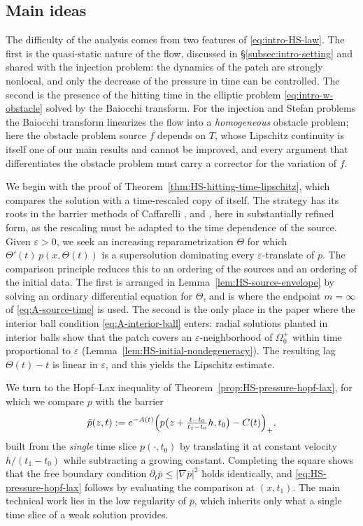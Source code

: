\documentclass[11pt]{amsart}
\numberwithin{equation}{section}
\numberwithin{figure}{section}
\theoremstyle{plain}
\theoremstyle{definition}
\theoremstyle{remark}
\theoremstyle{plain}
\newcommand{\abs}[1]{\lvert #1 \rvert}
\newcommand{\vep}{\varepsilon}
\begin{document}
\subsection{Main ideas}\label{subsec:intro-ideas}

The difficulty of the analysis comes from two features of \eqref{eq:intro-HS-law}.
The first is the quasi-static nature of the
flow, discussed in \S\ref{subsec:intro-setting} and shared with the injection
problem: the dynamics of the patch are strongly
nonlocal, and only the decrease of the pressure in time can be controlled. The second is the presence of the
hitting time in the elliptic problem \eqref{eq:intro-w-obstacle} solved by the Baiocchi transform. For the injection and
Stefan problems the Baiocchi transform linearizes the flow into a {\it homogeneous} obstacle
problem; here the obstacle problem source $f$ depends on $T$, whose Lipschitz continuity is itself
one of our main results and cannot be improved, and every argument that differentiates the obstacle problem must carry a corrector
for the variation of $f$.


We begin with the proof of Theorem~\ref{thm:HS-hitting-time-lipschitz}, which compares the
solution with a time-rescaled copy of itself. The strategy has its roots in the
barrier methods of Caffarelli \cite{Caffarelli77,Caffarelli98}, and \cite{kim03}, here in substantially refined form, as the rescaling must
be adapted to the time dependence of the source. Given $\vep>0$, we seek an
increasing reparametrization $\Theta$ for which $\Theta'(t)\,p(x,\Theta(t))$ is a
supersolution dominating every $\vep$-translate of $p$. The comparison principle reduces
this to an ordering of the sources and an ordering of the initial data. The first is
arranged in Lemma~\ref{lem:HS-source-envelope} by solving an ordinary differential
equation for $\Theta$, and is where the endpoint $m=\infty$ of \eqref{eq:A-source-time} is
used. The second is the only place in the paper where the interior ball condition
\eqref{eq:A-interior-ball} enters: radial solutions planted in interior balls show that
the patch covers an $\vep$-neighborhood of $\Omega_0^{+}$ within time proportional to
$\vep$ (Lemma~\ref{lem:HS-initial-nondegeneracy}). The resulting lag $\Theta(t)-t$ is
linear in $\vep$, and this yields the Lipschitz estimate.


We turn to the Hopf--Lax inequality of Theorem~\ref{prop:HS-pressure-hopf-lax}, for which we compare $p$
with the barrier
\[
    \bar p(z,t):=
    e^{-A(t)}
    \Bigl(p\bigl(z+\tfrac{t-t_0}{t_1-t_0}h,t_0\bigr)-C(t)\Bigr)_+ ,
\]
built from the {\it single} time slice $p(\cdot,t_0)$ by translating it at constant velocity
$h/(t_1-t_0)$ while subtracting a growing constant. Completing the square shows that the
free boundary condition $\partial_t\bar p\leq\abs{\nabla\bar p}^2$ holds identically, and \eqref{eq:HS-pressure-hopf-lax}
follows by evaluating the comparison at $(x,t_1)$. The main technical work lies in the low
regularity of $\bar p$, which inherits only what a single time slice of a weak solution
provides.
\end{document}
